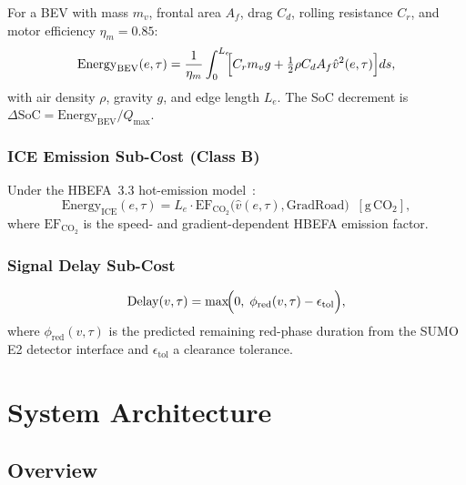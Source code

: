 \documentclass[journal,letterpaper,10pt]{IEEEtran}
\theoremstyle{definition}
\theoremstyle{remark}
\begin{document}
For a BEV with mass $m_v$, frontal area $A_f$, drag $C_d$, rolling
resistance $C_r$, and motor efficiency $\eta_m=0.85$:
\begin{equation}
  \mathrm{Energy}_{\mathrm{BEV}}(e,\tau)
  =
  \frac{1}{\eta_m}
  \int_{0}^{L_e}
  \!\!\Bigl[C_r m_v g
    +\tfrac{1}{2}\rho C_d A_f
    \hat{v}^{2}(e,\tau)\Bigr]ds,
  \label{eq:bev_energy}
\end{equation}
with air density $\rho$, gravity $g$, and edge length $L_e$.  The
SoC decrement is $\Delta\mathrm{SoC}=\mathrm{Energy}_{\mathrm{BEV}}/Q_{\max}$.

\subsubsection{ICE Emission Sub-Cost (Class B)}

Under the HBEFA~3.3 hot-emission model~\cite{hbefa33}:
\begin{equation}
  \mathrm{Energy}_{\mathrm{ICE}}(e,\tau)
  =
  L_e\cdot
  \mathrm{EF}_{\mathrm{CO_2}}\!\bigl(\hat{v}(e,\tau),
  \mathrm{GradRoad}\bigr)
  \;\;[\mathrm{g\,CO_2}],
  \label{eq:ice_energy}
\end{equation}
where $\mathrm{EF}_{\mathrm{CO_2}}$ is the speed- and
gradient-dependent HBEFA emission factor.

\subsubsection{Signal Delay Sub-Cost}

\begin{equation}
  \mathrm{Delay}(v,\tau)
  =
  \max\!\Bigl(0,\;
    \phi_{\mathrm{red}}(v,\tau)-\epsilon_{\mathrm{tol}}
  \Bigr),
  \label{eq:delay}
\end{equation}
where $\phi_{\mathrm{red}}(v,\tau)$ is the predicted remaining
red-phase duration from the SUMO E2 detector interface and
$\epsilon_{\mathrm{tol}}$ a clearance tolerance.

\section{System Architecture}
\label{sec:arch}

\subsection{Overview}
\end{document}
